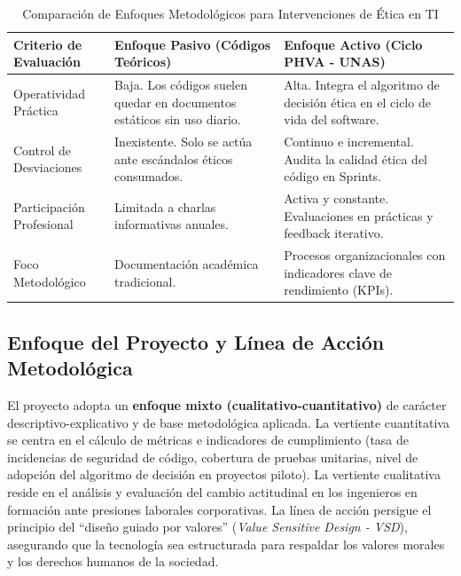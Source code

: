 \documentclass[12pt,a4paper]{article}
\begin{document}
\begin{table}[H]
\centering
\caption{Comparación de Enfoques Metodológicos para Intervenciones de Ética en TI}
\label{tab:comparacion_enfoques}
\begin{tabularx}{\textwidth}{lXX}
\toprule
\textbf{Criterio de Evaluación} & \textbf{Enfoque Pasivo (Códigos Teóricos)} & \textbf{Enfoque Activo (Ciclo PHVA - UNAS)} \\
\midrule
Operatividad Práctica & Baja. Los códigos suelen quedar en documentos estáticos sin uso diario. & Alta. Integra el algoritmo de decisión ética en el ciclo de vida del software. \\
Control de Desviaciones & Inexistente. Solo se actúa ante escándalos éticos consumados. & Continuo e incremental. Audita la calidad ética del código en Sprints. \\
Participación Profesional & Limitada a charlas informativas anuales. & Activa y constante. Evaluaciones en prácticas y feedback iterativo. \\
Foco Metodológico & Documentación académica tradicional. & Procesos organizacionales con indicadores clave de rendimiento (KPIs). \\
\bottomrule
\end{tabularx}
\end{table}

\subsection{Enfoque del Proyecto y Línea de Acción Metodológica}
El proyecto adopta un \textbf{enfoque mixto (cualitativo-cuantitativo)} de carácter descriptivo-explicativo y de base metodológica aplicada. La vertiente cuantitativa se centra en el cálculo de métricas e indicadores de cumplimiento (tasa de incidencias de seguridad de código, cobertura de pruebas unitarias, nivel de adopción del algoritmo de decisión en proyectos piloto). La vertiente cualitativa reside en el análisis y evaluación del cambio actitudinal en los ingenieros en formación ante presiones laborales corporativas. La línea de acción persigue el principio del ``diseño guiado por valores'' (\textit{Value Sensitive Design - VSD}), asegurando que la tecnología sea estructurada para respaldar los valores morales y los derechos humanos de la sociedad.
\end{document}
